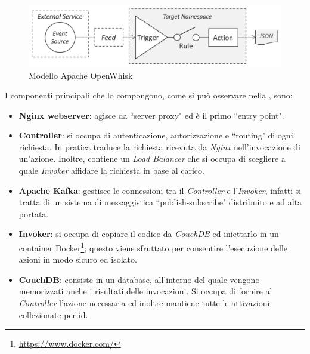 \documentclass[12pt,a4paper,openany,twoside]{book}
\begin{document}
\begin{figure}[h]
    \centering
    \includegraphics[width=\linewidth]{figures/Programming_model_OpenWhisk.pdf}
    \caption{Modello Apache OpenWhisk}
    \label{fig:modello-apache-openwhisk}
\end{figure}
\noindent
I componenti principali che lo compongono, come si può osservare nella , sono:
\begin{itemize}
    \item \textbf{Nginx webserver}: agisce da ``server proxy" ed è il primo ``entry point".
    
    \item \textbf{Controller}: si occupa di autenticazione, autorizzazione e ``routing" di ogni richiesta.
    In pratica traduce la richiesta ricevuta da \textit{Nginx} nell'invocazione di un'azione. Inoltre, contiene un \textit{Load Balancer} che si occupa di scegliere a quale \textit{Invoker} affidare la richiesta in base al carico.
    
    \item \textbf{Apache Kafka}: gestisce le connessioni tra il \textit{Controller} e l'\textit{Invoker}, infatti si tratta di un sistema di messaggistica ``publish-subscribe" distribuito e ad alta portata.
    
    \item \textbf{Invoker}: si occupa di copiare il codice da \textit{CouchDB} ed iniettarlo in un container Docker\footnote{\url{https://www.docker.com/}}; questo viene sfruttato per consentire l'esecuzione delle azioni in modo sicuro ed isolato.
    
    \item \textbf{CouchDB}: consiste in un database, all'interno del quale vengono memorizzati anche i risultati delle invocazioni. Si occupa di fornire al \textit{Controller} l'azione necessaria ed inoltre mantiene tutte le attivazioni collezionate per id.
\end{itemize}
\end{document}
